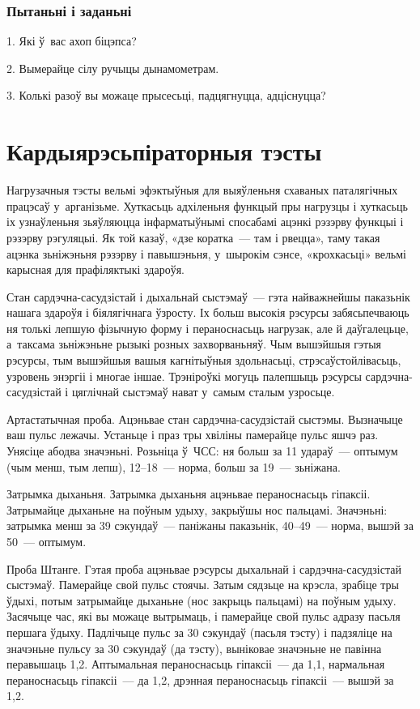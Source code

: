 \subsubsection{Пытаньні і заданьні}

1. Які ў~вас ахоп біцэпса?

2. Вымерайце сілу ручыцы дынамометрам.

3. Колькі разоў вы можаце прысесьці, падцягнуцца, адціснуцца?


\section{Кардыярэсьпіраторныя тэсты}

Нагрузачныя тэсты вельмі эфэктыўныя для выяўленьня схаваных паталягічных працэсаў у~арганізьме. Хуткасьць адхіленьня функцый пры нагрузцы і хуткасьць іх узнаўленьня зьяўляюцца інфарматыўнымі спосабамі ацэнкі рэзэрву функцыі і рэзэрву рэгуляцыі. Як той казаў, «дзе коратка~--- там і рвецца», таму такая ацэнка зьніжэньня рэзэрву і павышэньня, у~шырокім сэнсе, «крохкасьці» вельмі карысная для прафіляктыкі здароўя.

Стан сардэчна-сасудзістай і дыхальнай сыстэмаў~--- гэта найважнейшы паказьнік нашага здароўя і біялягічнага ўзросту. Іх больш высокія рэсурсы забясьпечваюць ня толькі лепшую фізычную форму і пераноснасьць нагрузак, але й даўгалецьце, а~таксама зьніжэньне рызыкі розных захворваньняў. Чым вышэйшыя гэтыя рэсурсы, тым вышэйшыя вашыя кагнітыўныя здольнасьці, стрэсаўстойлівасьць, узровень энэргіі і многае іншае. Трэніроўкі могуць палепшыць рэсурсы сардэчна-сасудзістай і цяглічнай сыстэмаў нават у~самым сталым узросьце.

Артастатычная проба. Ацэньвае стан сардэчна-сасудзістай сыстэмы. Вызначыце ваш пульс лежачы. Устаньце і праз тры хвіліны памерайце пульс яшчэ раз. Унясіце абодва значэньні. Розьніца ў~ЧСС: ня больш за 11 удараў~--- оптымум (чым менш, тым лепш), 12--18~--- норма, больш за 19~--- зьніжана.

Затрымка дыханьня. Затрымка дыханьня ацэньвае пераноснасьць гіпаксіі. Затрымайце дыханьне на поўным удыху, закрыўшы нос пальцамі. Значэньні: затрымка менш за 39 сэкундаў~--- паніжаны паказьнік, 40--49~--- норма, вышэй за 50~--- оптымум.

Проба Штанге. Гэтая проба ацэньвае рэсурсы дыхальнай і сардэчна-сасудзістай сыстэмаў. Памерайце свой пульс стоячы. Затым сядзьце на крэсла, зрабіце тры ўдыхі, потым затрымайце дыханьне (нос закрыць пальцамі) на поўным удыху. Засячыце час, які вы можаце вытрымаць, і памерайце свой пульс адразу пасьля першага ўдыху. Падлічыце пульс за 30 сэкундаў (пасьля тэсту) і падзяліце на значэньне пульсу за 30 сэкундаў (да тэсту), выніковае значэньне не павінна перавышаць 1,2. Аптымальная пераноснасьць гіпаксіі~--- да 1,1, нармальная пераноснасьць гіпаксіі~--- да 1,2, дрэнная пераноснасьць гіпаксіі~--- вышэй за 1,2.

